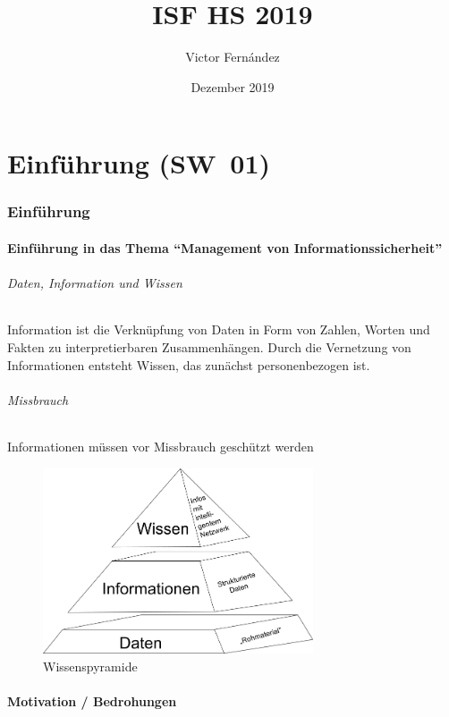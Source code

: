 \documentclass[10pt,a4paper]{article}
\title{ISF HS 2019}
\author{Victor Fernández}
\date{Dezember 2019}
\begin{document}
\maketitle
\thispagestyle{empty}
\tableofcontents
\thispagestyle{empty}
\pagebreak

\part{Einführung (SW~01)}
\section{Einführung}
\subsection*{Einführung in das Thema "`Management von Informationssicherheit"'}
\paragraph*{Daten, Information und Wissen}
Information ist die Verknüpfung von Daten in Form von Zahlen, Worten und Fakten zu interpretierbaren Zusammenhängen.
Durch die Vernetzung von Informationen entsteht Wissen, das zunächst personenbezogen ist.
\paragraph*{Missbrauch}Informationen müssen vor Missbrauch geschützt werden
\begin{figure}[h]
    \begin{center}
    \includegraphics[width=8cm]{images/Wissenspyramide.png}
    \caption{Wissenspyramide}
    \label{Wissenspyramide}
    \end{center}
\end{figure}
\subsection*{Motivation / Bedrohungen}
\end{document}
